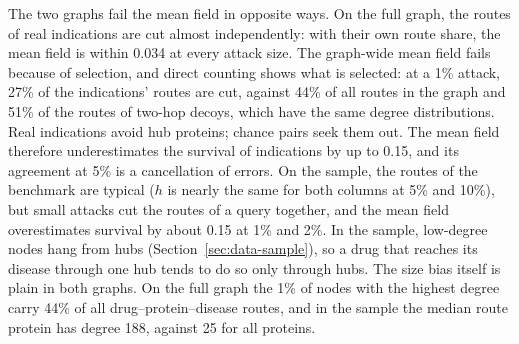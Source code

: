 \begin{table}[!htbp]
\centering
\small
\caption{Route survival under degree attack for queries whose endpoints survive.
``Graph-wide'' uses Eq.~\eqref{eq:mf} with $h$ computed from all
drug--protein--disease routes of the graph; ``own routes'' uses the share of
the task's own routes that the attack cuts. Full graph: the 1,931 two-hop
indications. Sample: the 200 benchmark queries.}
\label{tab:mf}
\end{table}

The two graphs fail the mean field in opposite ways. On the full graph, the
routes of real indications are cut almost independently: with their own route
share, the mean field is within 0.034 at every attack size. The graph-wide
mean field fails because of selection, and direct counting shows what is
selected: at a 1\% attack, 27\% of the indications' routes are cut, against 44\%
of all routes in the graph and 51\% of the routes of two-hop decoys, which have
the same degree distributions. Real indications avoid hub proteins; chance
pairs seek them out. The mean field therefore underestimates the survival of
indications by up to 0.15, and its agreement at 5\% is a cancellation of errors. On the sample, the routes of the benchmark are typical
($h$ is nearly the same for both columns at 5\% and 10\%), but small attacks
cut the routes of a query together, and the mean field overestimates survival by
about 0.15 at 1\% and 2\%. In the sample, low-degree nodes hang from hubs
(Section~\ref{sec:data-sample}), so a drug that reaches its disease through one
hub tends to do so only through hubs. The size bias itself is plain in both graphs. On the full graph the 1\% of nodes
with the highest degree carry 44\% of all drug--protein--disease routes, and in
the sample the median route protein has degree 188, against 25 for all
proteins.

